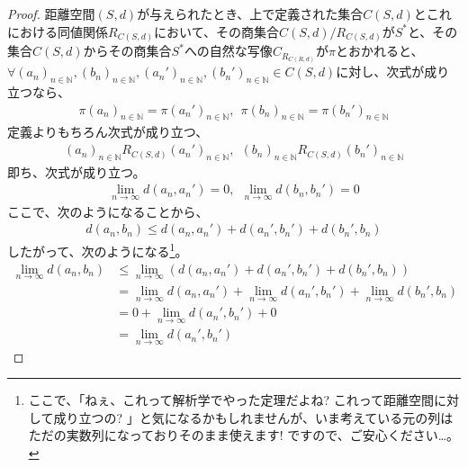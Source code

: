 \documentclass[dvipdfmx]{jsarticle}
\begin{document}
\begin{proof}
距離空間$(S,d)$が与えられたとき、上で定義された集合$C(S,d)$とこれにおける同値関係$R_{C(S,d)}$において、その商集合${C(S,d)}/{R_{C(S,d)}}$が$S^{*}$と、その集合$C(S,d)$からその商集合$S^{*}$への自然な写像$C_{R_{C(R,d)}}$が$\pi$とおかれると、$\forall\left( a_{n} \right)_{n \in \mathbb{N}},\left( b_{n} \right)_{n \in \mathbb{N}},\left( a_{n}' \right)_{n \in \mathbb{N}},\left( b_{n}' \right)_{n \in \mathbb{N}} \in C(S,d)$に対し、次式が成り立つなら、
\begin{align*}
\pi\left( a_{n} \right)_{n \in \mathbb{N}} = \pi\left( a_{n}' \right)_{n \in \mathbb{N}},\ \ \pi\left( b_{n} \right)_{n \in \mathbb{N}} = \pi\left( b_{n}' \right)_{n \in \mathbb{N}}
\end{align*}
定義よりもちろん次式が成り立つ、
\begin{align*}
\left( a_{n} \right)_{n \in \mathbb{N}}R_{C(S,d)}\left( a_{n}' \right)_{n \in \mathbb{N}},\ \ \left( b_{n} \right)_{n \in \mathbb{N}}R_{C(S,d)}\left( b_{n}' \right)_{n \in \mathbb{N}}
\end{align*}
即ち、次式が成り立つ。
\begin{align*}
\lim_{n \rightarrow \infty}{d\left( a_{n},a_{n}' \right)} = 0,\ \ \lim_{n \rightarrow \infty}{d\left( b_{n},b_{n}' \right)} = 0
\end{align*}
ここで、次のようになることから、
\begin{align*}
d\left( a_{n},b_{n} \right) \leq d\left( a_{n},a_{n}' \right) + d\left( a_{n}',b_{n}' \right) + d\left( b_{n}',b_{n} \right)
\end{align*}
したがって、次のようになる\footnote{ここで、「ねぇ、これって解析学でやった定理だよね? これって距離空間に対して成り立つの? 」と気になるかもしれませんが、いま考えている元の列はただの実数列になっておりそのまま使えます! ですので、ご安心ください…。}。
\begin{align*}
\lim_{n \rightarrow \infty}{d\left( a_{n},b_{n} \right)} &\leq \lim_{n \rightarrow \infty}\left( d\left( a_{n},a_{n}' \right) + d\left( a_{n}',b_{n}' \right) + d\left( b_{n}',b_{n} \right) \right)\\
&= \lim_{n \rightarrow \infty}{d\left( a_{n},a_{n}' \right)} + \lim_{n \rightarrow \infty}{d\left( a_{n}',b_{n}' \right)} + \lim_{n \rightarrow \infty}{d\left( b_{n}',b_{n} \right)}\\
&= 0 + \lim_{n \rightarrow \infty}{d\left( a_{n}',b_{n}' \right)} + 0\\
&= \lim_{n \rightarrow \infty}{d\left( a_{n}',b_{n}' \right)}
\end{align*}

\end{proof}
\end{document}

